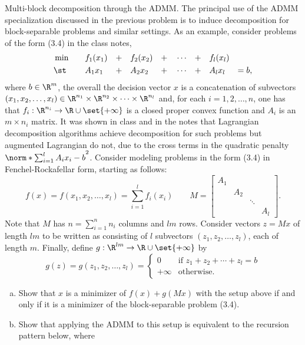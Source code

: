 \documentclass{article}
\theoremstyle{plain}
\theoremstyle{definition}
\theoremstyle{remark}
\begin{document}
\begin{problem}
    {Multi-block decomposition through the ADMM.}
    The principal use of the ADMM specialization discussed in the previous problem is to induce decomposition for block-separable problems and similar settings. As an example, consider problems of the form (3.4) in the class notes,
    \begin{alignat*}{9}
        &\min \quad&& f_1(x_1)&&+&&f_2(x_2)&&+&&\cdots&&+&&f_l(x_l)& \\
        &\st  && A_1x_1&&+&&A_2x_2&&+&&\cdots&&+&&A_lx_l&=b,
    \end{alignat*}
    where $b\in\R^m$, the overall the decision vector $x$ is a concatenation of subvectors $(x_1,x_2,\ldots,x_l) \in \R^{n_1} \times \R^{n_2} \times \cdots \times \R^{n_l}$ and, for each $i=1,2,\ldots,n$, one has that $f_i:\R^{n_i}\rightarrow\R\cup\set{+\infty}$ is a closed proper convex function and $A_i$ is an $m\times n_i$ matrix. It was shown in class and in the notes that Lagrangian decomposition algorithms achieve decomposition for such problems but augmented Lagrangian do not, due to the cross terms in the quadratic penalty $\norm*{\sum_{i=1}^lA_ix_i-b}^2$. Consider modeling problems in the form (3.4) in Fenchel-Rockafellar form, starting as follows:
    \[f(x)=f(x_1,x_2,\ldots,x_l)=\sum_{i=1}^lf_i(x_i)\qquad M=\begin{bmatrix}
        A_1 &&& \\
        & A_2 && \\
        && \ddots & \\
        &&& A_l
    \end{bmatrix}.\]
    Note that $M$ has $n=\sum_{i=1}^{n} n_i$ columns and $lm$ rows. Consider vectors $z=Mx$ of length $lm$ to be written as consisting of $l$ subvectors $(z_1, z_2, \ldots, z_l)$, each of length $m$. Finally, define $g:\R^{lm}\rightarrow\R\cup\set{+\infty}$ by
    \[g(z)=g(z_1,z_2,\ldots,z_l)=\begin{cases}
        0 & \text{if } z_1+z_2+\cdots+z_l=b \\
        +\infty & \text{otherwise}.
    \end{cases}\]
    \begin{enumerate}[(a)]
        \item Show that $x$ is a minimizer of $f(x)+g(Mx)$ with the setup above if and only if it is a minimizer of the block-separable problem (3.4).
        \item Show that applying the ADMM to this setup is equivalent to the recursion pattern below, where

\end{enumerate}
\end{problem}
\end{document}
